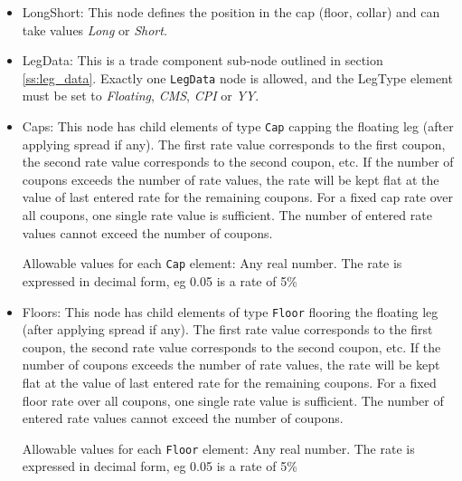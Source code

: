\begin{itemize}

\item LongShort: This node defines the position in the cap (floor, collar) and can take values \emph{Long} or \emph{Short}.

\item LegData: This is a trade component sub-node outlined in section \ref{ss:leg_data}. Exactly
  one \lstinline!LegData! node is allowed, and the LegType element must
  be set to \emph{Floating}, \emph{CMS}, \emph{CPI} or \emph{YY}.

\item Caps: This node has child elements of type \lstinline!Cap!
  capping the floating leg (after applying spread if any). The first rate value corresponds to the
  first coupon, the second rate value corresponds to the second
  coupon, etc. If the number of coupons exceeds the number of rate
  values, the rate will be kept flat at the value of last entered rate
  for the remaining coupons. For a fixed cap rate over all coupons,
  one single rate value is sufficient. The number of entered rate
  values cannot exceed the number of coupons.  

  Allowable values for each \lstinline!Cap! element: Any real number. The rate is expressed in decimal form, eg 0.05 is
  a rate of 5\%

\item Floors: This node has child elements of type
  \lstinline!Floor! flooring the floating leg (after applying spread if any).  The first rate value
  corresponds to the first coupon, the second rate value corresponds
  to the second coupon, etc. If the number of coupons exceeds the
  number of rate values, the rate will be kept flat at the value of
  last entered rate for the remaining coupons. For a fixed floor rate
  over all coupons, one single rate value is sufficient. The number of
  entered rate values cannot exceed the number of coupons.

  Allowable values for each \lstinline!Floor! element: Any real number. The rate is expressed in decimal form, eg 0.05 is
  a rate of 5\%

\end{itemize}
